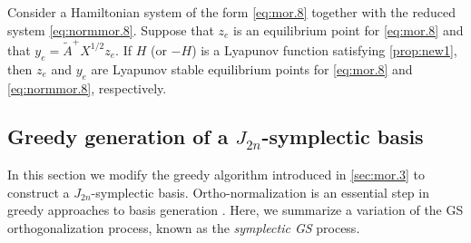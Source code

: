 \begin{theorem}
\cite{doi:10.1137/17M1111991} Consider a Hamiltonian system of the form \cref{eq:mor.8} together with the reduced system \cref{eq:normmor.8}. Suppose that $z_e$ is an equilibrium point for \cref{eq:mor.8} and that $y_e = \tilde A ^+ X^{1/2} z_e$. If $H$ (or $-H$) is a Lyapunov function satisfying \cref{prop:new1}, then $z_e$ and $y_e$ are Lyapunov stable equilibrium points for \cref{eq:mor.8} and \cref{eq:normmor.8}, respectively.
\end{theorem}

\subsection{Greedy generation of a $J_{2n}$-symplectic basis} \label{sec:normmor.2}
In this section we modify the greedy algorithm introduced in \cref{sec:mor.3} to construct a $J_{2n}$-symplectic basis. Ortho-normalization is an essential step in greedy approaches to basis generation \cite{hesthaven2015certified,quarteroni2015reduced}. Here, we summarize a variation of the GS orthogonalization process, known as the \emph{symplectic GS} process.


